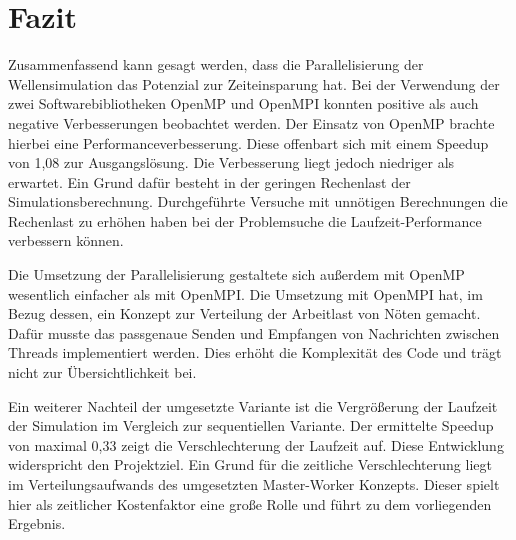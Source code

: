 
\section{Fazit}
Zusammenfassend kann gesagt werden, dass die Parallelisierung der Wellensimulation das Potenzial zur Zeiteinsparung hat. Bei der Verwendung der zwei Softwarebibliotheken OpenMP und OpenMPI konnten positive als auch negative Verbesserungen beobachtet werden.
Der Einsatz von OpenMP brachte hierbei eine Performanceverbesserung. Diese offenbart sich mit einem Speedup von 1,08 zur Ausgangslösung. Die Verbesserung liegt jedoch niedriger als erwartet. Ein Grund dafür besteht in der geringen Rechenlast der Simulationsberechnung. Durchgeführte Versuche mit unnötigen Berechnungen die Rechenlast zu erhöhen haben bei der Problemsuche die Laufzeit-Performance verbessern können.
 
Die Umsetzung der Parallelisierung gestaltete sich außerdem mit OpenMP wesentlich einfacher als mit OpenMPI. Die Umsetzung mit OpenMPI hat, im Bezug dessen, ein Konzept zur Verteilung der Arbeitlast von Nöten gemacht. Dafür musste das passgenaue Senden und Empfangen von Nachrichten zwischen Threads implementiert werden. Dies erhöht die Komplexität des Code und trägt nicht zur Übersichtlichkeit bei. 

Ein weiterer Nachteil der umgesetzte Variante ist die Vergrößerung der Laufzeit der Simulation im Vergleich zur sequentiellen Variante. Der ermittelte Speedup von maximal 0,33 zeigt die Verschlechterung der Laufzeit auf. Diese Entwicklung widerspricht den Projektziel. Ein Grund für die zeitliche Verschlechterung liegt im Verteilungsaufwands des umgesetzten Master-Worker Konzepts. Dieser spielt hier als zeitlicher Kostenfaktor eine große Rolle und führt zu dem vorliegenden Ergebnis.
